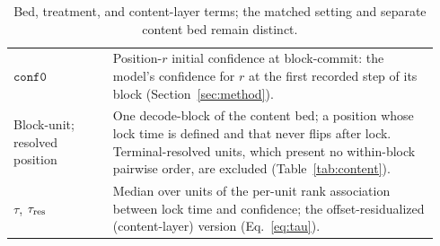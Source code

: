 \documentclass{article}
\begin{document}
\begin{table}[H]
\begin{tabular}{@{}>{\raggedright\arraybackslash}p{0.22\linewidth}
                    >{\raggedright\arraybackslash}p{0.72\linewidth}@{}}
$\texttt{conf0}$ & Position-$r$ initial confidence at block-commit: the model's
confidence for $r$ at the first recorded step of its block
(Section~\ref{sec:method}). \\
Block-unit; resolved position & One decode-block of the content bed; a position
whose lock time is defined and that never flips after lock. Terminal-resolved
units, which present no within-block pairwise order, are excluded
(Table~\ref{tab:content}). \\
$\tau$, $\tau_{\rm res}$ & Median over units of the per-unit rank association
between lock time and confidence; the offset-residualized (content-layer)
version (Eq.~\eqref{eq:tau}). \\
\bottomrule
\end{tabular}
\caption{Bed, treatment, and content-layer terms; the matched setting and separate
content bed remain distinct.}
\label{tab:beds}
\end{table}

\FloatBarrier
\end{document}
